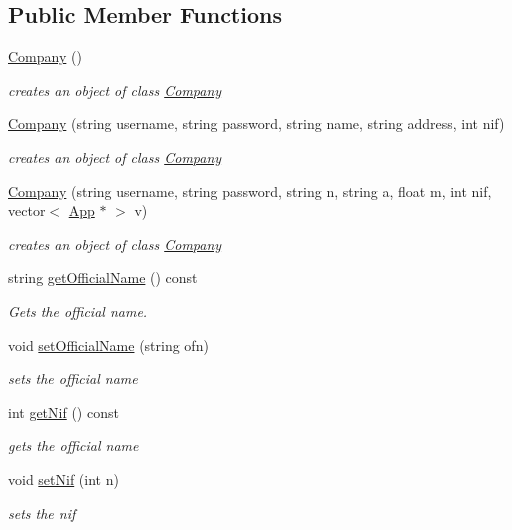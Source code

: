 \subsection*{Public Member Functions}
\begin{DoxyCompactItemize}
\item 
\hyperlink{class_company_a29937dda711b09df306ae7ca9b3d6b42}{Company} ()
\begin{DoxyCompactList}\small\item\em creates an object of class \hyperlink{class_company}{Company} \end{DoxyCompactList}\item 
\hyperlink{class_company_af668b01e0be2b4472dbc443fb1e39e51}{Company} (string username, string password, string name, string address, int nif)
\begin{DoxyCompactList}\small\item\em creates an object of class \hyperlink{class_company}{Company} \end{DoxyCompactList}\item 
\hyperlink{class_company_a1f0fd388082b43b5779c5119ce5a04f8}{Company} (string username, string password, string n, string a, float m, int nif, vector$<$ \hyperlink{class_app}{App} $\ast$ $>$ v)
\begin{DoxyCompactList}\small\item\em creates an object of class \hyperlink{class_company}{Company} \end{DoxyCompactList}\item 
string \hyperlink{class_company_a9b62ad43569259771a2d4be5fb2c9255}{get\-Official\-Name} () const 
\begin{DoxyCompactList}\small\item\em Gets the official name. \end{DoxyCompactList}\item 
void \hyperlink{class_company_aa0a41e16db04009dea627e148bbb1467}{set\-Official\-Name} (string ofn)
\begin{DoxyCompactList}\small\item\em sets the official name \end{DoxyCompactList}\item 
int \hyperlink{class_company_a9bd541b695636b65637a34b209d6537f}{get\-Nif} () const 
\begin{DoxyCompactList}\small\item\em gets the official name \end{DoxyCompactList}\item 
void \hyperlink{class_company_abec6540c99b8f01ee7a63d229e364868}{set\-Nif} (int n)
\begin{DoxyCompactList}\small\item\em sets the nif \end{DoxyCompactList}\end{DoxyCompactItemize}
